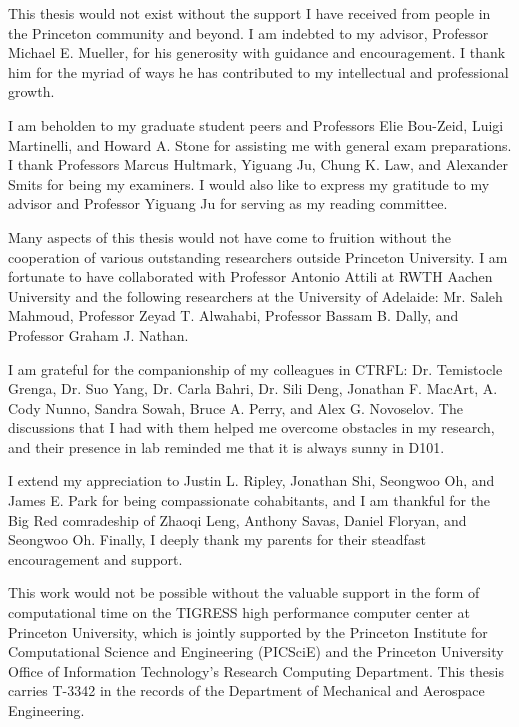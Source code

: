 This thesis would not exist without the support I have received from people in the Princeton community and beyond. I am indebted to my advisor, Professor Michael E. Mueller, for his generosity with guidance and encouragement. I thank him for the myriad of ways he has contributed to my intellectual and professional growth.

I am beholden to my graduate student peers and Professors Elie Bou-Zeid, Luigi Martinelli, and Howard A. Stone for assisting me with general exam preparations. I thank Professors Marcus Hultmark, Yiguang Ju, Chung K. Law, and Alexander Smits for being my examiners. I would also like to express my gratitude to my advisor and Professor Yiguang Ju for serving as my reading committee.

Many aspects of this thesis would not have come to fruition without the cooperation of various outstanding researchers outside Princeton University. I am fortunate to have collaborated with Professor Antonio Attili at RWTH Aachen University and the following researchers at the University of Adelaide: Mr. Saleh Mahmoud, Professor Zeyad T. Alwahabi, Professor Bassam B. Dally, and Professor Graham J. Nathan.

I am grateful for the companionship of my colleagues in CTRFL: Dr. Temistocle Grenga, Dr. Suo Yang, Dr. Carla Bahri, Dr. Sili Deng, Jonathan F. MacArt, A. Cody Nunno, Sandra Sowah, Bruce A. Perry, and Alex G. Novoselov. The discussions that I had with them helped me overcome obstacles in my research, and their presence in lab reminded me that it is always sunny in D101.

I extend my appreciation to Justin L. Ripley, Jonathan Shi, Seongwoo Oh, and James E. Park for being compassionate cohabitants, and I am thankful for the Big Red comradeship of Zhaoqi Leng, Anthony Savas, Daniel Floryan, and Seongwoo Oh. Finally, I deeply thank my parents for their steadfast encouragement and support.

This work would not be possible without the valuable support in the form of computational time on the TIGRESS high performance computer center at Princeton University, which is jointly supported by the Princeton Institute for Computational Science and Engineering (PICSciE) and the Princeton University Office of Information Technology's Research Computing Department. This thesis carries T-3342 in the records of the Department of Mechanical and Aerospace Engineering.



